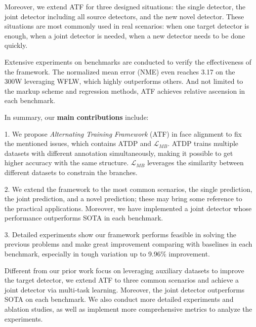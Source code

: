 \documentclass[journal,transmag]{IEEEtran}
\begin{document}
Moreover, we extend ATF for three designed situations: the single detector, the joint detector including all source detectors, and the new novel detector.
These situations are most commonly used in real scenarios: when one target detector is enough, when a joint detector is needed, when a new detector needs to be done quickly.

Extensive experiments on benchmarks \cite{300W,LABWFLW,COFW,AFLW} are conducted to verify the effectiveness of the framework.
The normalized mean error (NME) even reaches 3.17 on the 300W leveraging WFLW, which highly outperforms others.
And not limited to the markup scheme and regression methods, ATF achieves relative ascension in each benchmark.

In summary, our {\bf main contributions} include:

   1. We propose \emph{Alternating Training Framework} (ATF) in face alignment to fix the mentioned issues, which contains ATDP and $\mathcal{L}_{MB}$.
   ATDP trains multiple datasets with different annotation simultaneously, making it possible to get higher accuracy with the same structure. 
   $\mathcal{L}_{MB}$ leverages the similarity between different datasets to constrain the branches. 

   2. We extend the framework to the most common scenarios, the single prediction, the joint prediction, and a novel prediction; 
   these may bring some reference to the practical applications. Moreover, we have implemented a joint detector whose performance outperforms SOTA in each benchmark.
   
   3. Detailed experiments show our framework performs feasible in solving the previous problems and make great improvement comparing with baselines in each benchmark, especially in tough variation up to 9.96\% improvement.


Different from our prior work\cite{Lan2020ATFTR} focus on leveraging auxiliary datasets to improve the target detector, we extend ATF to three common scenarios and achieve a joint detector via multi-task learning.
Moreover, the joint detector outperforms SOTA on each benchmark. 
We also conduct more detailed experiments and ablation studies, as well as implement more comprehensive metrics to analyze the experiments.


\end{document}
